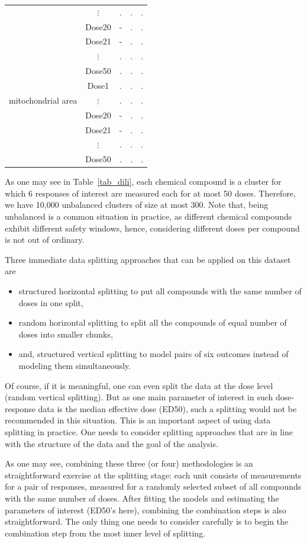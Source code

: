 \documentclass[11pt,a5paper,twoside]{book}
\begin{document}
\begin{table}[h]
{\begin{tabular}{l|c|ccc}
 & $\vdots$ &. & .& .\\ 
  & Dose20 &- & .& .\\ 
   & Dose21 &- & .& .\\ 
    & $\vdots$ &. & .& .\\ 
 & Dose50 &. & .& .\\ 
 \hline
      \multirow{3}[15]{*}{mitochondrial area} & Dose1 &. & .& . \\ 
 & $\vdots$ &. & .& .\\ 
  & Dose20 &- & .& .\\ 
   & Dose21 &- & .& .\\ 
    & $\vdots$ &. & .& .\\ 
 & Dose50 &. & .& .\\ 
   \hline\hline
\end{tabular}}
\end{table}


As one may see in Table~\ref{tab_dili}, each chemical compound is a cluster for which 6 responses of interest are measured each for at most 50 doses. Therefore, we have 10,000 unbalanced clusters of size at most 300. Note that, being unbalanced is a common situation in practice, as different chemical compounds exhibit different safety windows, hence, considering different doses per compound is not out of ordinary. 

Three immediate data splitting approaches that can be applied on this dataset are
\begin{itemize}
\item structured horizontal splitting to put all compounds with the same number of doses in one split,
\item random horizontal splitting to split all the compounds of equal number of doses into smaller chunks,
\item and, structured vertical splitting to model pairs of six outcomes instead of modeling them simultaneously.
\end{itemize}
Of course, if it is meaningful, one can even split the data at the dose level (random vertical splitting). But as one main parameter of interest in such dose-response data is the median effective dose (ED50), such a splitting would not be recommended in this situation. This is an important aspect of using data splitting in practice. One needs to consider splitting approaches that are in line with the structure of the data and the goal of the analysis.

As one may see, combining these three (or four) methodologies is an straightforward exercise at the splitting stage: each unit consists of measurements for a pair of responses, measured for a randomly selected subset of all compounds with the same number of doses. After fitting the models and estimating the parameters of interest (ED50's here), combining the combination steps is also straightforward. The only thing one needs to consider carefully is to begin the combination step from the most inner level of splitting. 
\end{document}

